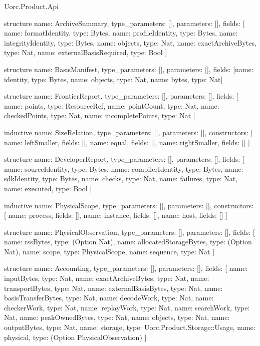 \begin{lexlean}{Uorc.Product.Api}
\begin{semanticmodule}
structure{
  name: ArchiveSummary,
  type_parameters: [],
  parameters: [],
  fields: [
    {name: formatIdentity, type: Bytes},
    {name: profileIdentity, type: Bytes},
    {name: integrityIdentity, type: Bytes},
    {name: objects, type: Nat},
    {name: exactArchiveBytes, type: Nat},
    {name: externalBasisRequired, type: Bool}
  ]
}

structure{
  name: BasisManifest,
  type_parameters: [],
  parameters: [],
  fields: [{name: identity, type: Bytes}, {name: objects, type: Nat}, {name: bytes, type: Nat}]
}

structure{
  name: FrontierReport,
  type_parameters: [],
  parameters: [],
  fields: [
    {name: points, type: ResourceRef},
    {name: pointCount, type: Nat},
    {name: checkedPoints, type: Nat},
    {name: incompletePoints, type: Nat}
  ]
}

inductive{
  name: SizeRelation,
  type_parameters: [],
  parameters: [],
  constructors: [
    {name: leftSmaller, fields: []},
    {name: equal, fields: []},
    {name: rightSmaller, fields: []}
  ]
}

structure{
  name: DeveloperReport,
  type_parameters: [],
  parameters: [],
  fields: [
    {name: sourceIdentity, type: Bytes},
    {name: compilerIdentity, type: Bytes},
    {name: sdkIdentity, type: Bytes},
    {name: checks, type: Nat},
    {name: failures, type: Nat},
    {name: executed, type: Bool}
  ]
}

inductive{
  name: PhysicalScope,
  type_parameters: [],
  parameters: [],
  constructors: [
    {name: process, fields: []},
    {name: instance, fields: []},
    {name: host, fields: []}
  ]
}

structure{
  name: PhysicalObservation,
  type_parameters: [],
  parameters: [],
  fields: [
    {name: rssBytes, type: (Option Nat)},
    {name: allocatedStorageBytes, type: (Option Nat)},
    {name: scope, type: PhysicalScope},
    {name: sequence, type: Nat}
  ]
}

structure{
  name: Accounting,
  type_parameters: [],
  parameters: [],
  fields: [
    {name: inputBytes, type: Nat},
    {name: exactArchiveBytes, type: Nat},
    {name: transportBytes, type: Nat},
    {name: externalBasisBytes, type: Nat},
    {name: basisTransferBytes, type: Nat},
    {name: decodeWork, type: Nat},
    {name: checkerWork, type: Nat},
    {name: replayWork, type: Nat},
    {name: searchWork, type: Nat},
    {name: peakOwnedBytes, type: Nat},
    {name: objects, type: Nat},
    {name: outputBytes, type: Nat},
    {name: storage, type: Uorc.Product.Storage::Usage},
    {name: physical, type: (Option PhysicalObservation)}
  ]
}


\end{semanticmodule}
\end{lexlean}
